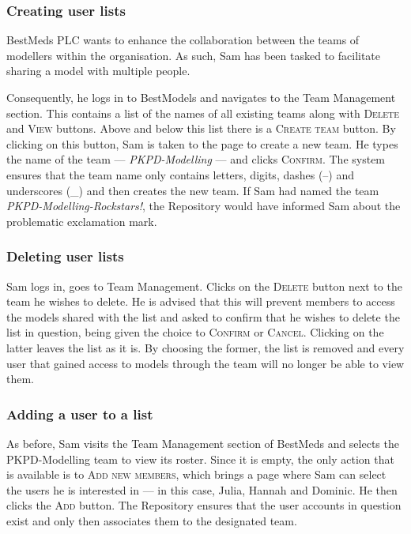 {\subsubsection{Creating user lists}
BestMeds PLC  wants to enhance the collaboration between the teams of modellers within the organisation. As such, Sam has been tasked to facilitate sharing a model with multiple people.

Consequently, he logs in to BestModels and navigates to the Team Management section. This contains a list of the names of all existing teams along with \textsc{Delete} and \textsc{View} buttons. Above and below this list there is a \textsc{Create team} button. By clicking on this button, Sam is taken to the page to create a new team. He types the name of the team --- \emph{PKPD-Modelling} --- and clicks \textsc{Confirm}. The system ensures that the team name only contains letters, digits, dashes (--) and underscores (\_) and then creates the new team. If Sam had named the team \emph{PKPD-Modelling-Rockstars!}, the Repository would have informed Sam about the problematic exclamation mark.

\subsubsection{Deleting user lists}

Sam logs in, goes to Team Management. Clicks on the \textsc{Delete} button next to the team he wishes to delete. He is advised that this will prevent members to access the models shared with the list and asked to confirm that he wishes to delete the list in question, being given the choice to \textsc{Confirm} or \textsc{Cancel}. Clicking on the latter leaves the list as it is. By choosing the former, the list is removed and every user that gained access to models through the team will no longer be able to view them.

\subsubsection{Adding a user to a list}
As before, Sam visits the Team Management section of BestMeds and selects the PKPD-Modelling team to view its roster. Since it is empty, the only action that is available is to \textsc{Add new members}, which brings a page where Sam can select the users he is interested in --- in this case, Julia, Hannah and Dominic. He then clicks the \textsc{Add} button. The Repository ensures that the user accounts in question exist and only then associates them to the designated team.

}
